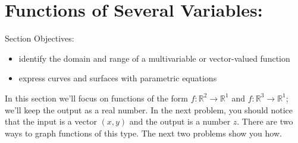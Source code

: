 \documentclass[10pt,]{book}
\theoremstyle{plain}
\theoremstyle{definition}
\theoremstyle{definition}
\theoremstyle{definition}
\theoremstyle{definition}
\theoremstyle{definition}
\numberwithin{equation}{section}
\begin{document}
\section[{Functions of Several Variables:}]{Functions of Several Variables:}\label{section-18}
Section Objectives: \leavevmode%
\begin{itemize}[label=\textbullet]
\item{}identify the domain and range of a multivariable or vector-valued function%
\item{}express curves and surfaces with parametric equations%
\end{itemize}
%
\par
In this section we'll focus on functions of the form \(f\colon \mathbb{R}^2\to\mathbb{R}^1\) and \(f\colon \mathbb{R}^3\to\mathbb{R}^1\); we'll keep the output as a real number. In the next problem, you should notice that the input is a vector \((x,y)\) and the output is a number \(z\). There are two ways to graph functions of this type. The next two problems show you how.%
\typeout{************************************************}
\typeout{************************************************}
\end{document}
